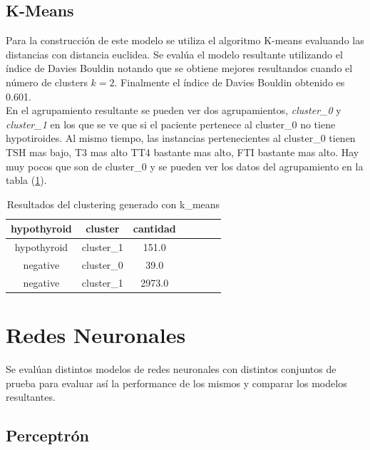 \documentclass[osajnl,twocolumn,showpacs,superscriptaddress,10pt,floatfix]{revtex4-1} %
\begin{document}
\subsection{K-Means}

Para la construcción de este modelo se utiliza el algoritmo K-means evaluando las distancias con distancia euclidea. Se evalúa el modelo resultante utilizando el índice de Davies Bouldin notando que se obtiene mejores resultandos cuando el número de clusters $k = 2$. Finalmente el índice de Davies Bouldin obtenido es 0.601. \\

En el agrupamiento resultante se pueden ver dos agrupamientos, \textit{cluster\_0} y \textit{cluster\_1} en los que se ve que si el paciente pertenece al cluster\_0 no tiene hypotiroides. Al mismo tiempo, las instancias pertenecientes al cluster\_0 tienen TSH mas bajo, T3 mas alto
TT4 bastante mas alto, FTI bastante mas alto. Hay muy pocos que son de cluster\_0 y se pueden ver los datos del agrupamiento en la tabla (\ref{table:k_means}). \\


\begin{table}[h!]
    \centering
    \begin{tabular}{ccccccc}
        hypothyroid & cluster & cantidad \\
        \hline
        hypothyroid & cluster\_1 & 151.0 \\
        negative & cluster\_0 & 39.0 \\
        negative  & cluster\_1 & 2973.0 \\
        \hline
    \end{tabular}
    \caption{Resultados del clustering generado con k\_means}
    \label{table:k_means}
\end{table}


\section{Redes Neuronales}

Se evalúan distintos modelos de redes neuronales con distintos conjuntos de prueba para evaluar así la performance de los mismos y comparar los modelos resultantes. \\

\subsection{Perceptrón}
\end{document}
